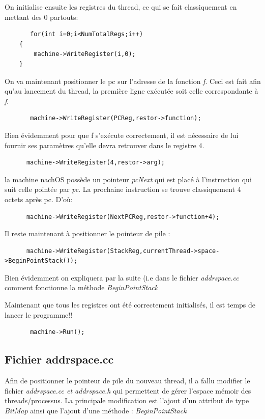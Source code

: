 \documentclass[a4paper,10pt]{report}
\begin{document}
      On initialise ensuite les registres du thread, ce qui se fait classiquement en mettant des 0 partouts:
      \begin{lstlisting}
       for(int i=0;i<NumTotalRegs;i++)
	{
		machine->WriteRegister(i,0);
	}
      \end{lstlisting}
      
      On va maintenant positionner le pc sur l'adresse de la fonction \emph{f}. Ceci est fait afin qu'au lancement du thread, la première ligne exécutée 
      soit celle correspondante à \emph{f}.
      \begin{lstlisting}
       machine->WriteRegister(PCReg,restor->function);
      \end{lstlisting}
      Bien évidemment pour que f s'exécute correctement, il est nécessaire de lui fournir ses paramètres qu'elle devra retrouver dans le registre 4.
      \begin{lstlisting}
      machine->WriteRegister(4,restor->arg);
      \end{lstlisting}
      
      la machine nachOS possède un pointeur \emph{pcNext} qui est placé à l'instruction qui suit celle pointée par \emph{pc}. La prochaine instruction 
      se trouve classiquement 4 octets après pc. D'où:
      \begin{lstlisting}
      machine->WriteRegister(NextPCReg,restor->function+4);
      \end{lstlisting}
      
      Il reste maintenant à positionner le pointeur de pile : 
      \begin{lstlisting}
      machine->WriteRegister(StackReg,currentThread->space->BeginPointStack());
      \end{lstlisting}
      Bien évidemment on expliquera par la suite (i.e dans le fichier \emph{addrspace.cc} comment fonctionne la méthode \emph{BeginPointStack}
      
      Maintenant que tous les registres ont été correctement initialisés, il est temps de lancer le programme!!
      \begin{lstlisting}
       machine->Run();
      \end{lstlisting}
  
 \textcolor{NavyBlue}{\subsection{Fichier addrspace.cc}}
  Afin de positionner le pointeur de pile du nouveau thread, il a fallu modifier le fichier \emph{addrspace.cc et addrspace.h} qui permettent de gérer 
  l'espace mémoir des threads/processus. La principale modification est l'ajout d'un attribut de type \emph{BitMap} ainsi que l'ajout d'une méthode :
  \emph{BeginPointStack}
  
\end{document}
